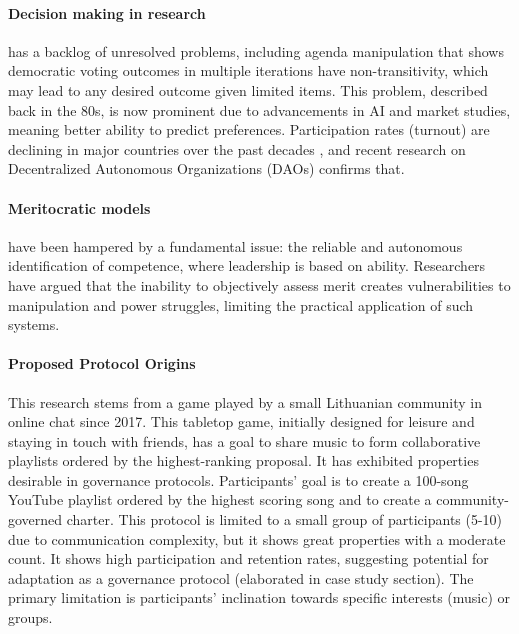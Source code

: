 \documentclass{article}
\begin{document}
\begin{CJK}{UTF8}{gbsn}
\begin{multicols}{2}
        \paragraph{Decision making in research} has a backlog of unresolved problems, including agenda manipulation that shows democratic voting outcomes in multiple iterations have non-transitivity, which may lead to any desired outcome given limited items\cite{McKelvey1976}. This problem, described back in the 80s, is now prominent due to advancements in AI and market studies, meaning better ability to predict preferences. Participation rates (turnout) are declining in major countries over the past decades \cite{Lawrence23}\cite{Filip24}, and recent research on Decentralized Autonomous Organizations (DAOs) confirms that\cite{Rainer2023}\cite{Marcella2016}\cite{Xuan2024}.
        \paragraph{Meritocratic models} have been hampered by a fundamental issue: the reliable and autonomous identification of competence, where leadership is based on ability. Researchers have argued\cite{Arrow2000} that the inability to objectively assess merit creates vulnerabilities to manipulation and power struggles, limiting the practical application of such systems.
        \paragraph{Proposed Protocol Origins}\label{sec:protocol_origins}
        This research stems from a game played by a small Lithuanian community in online chat since 2017. This tabletop game, initially designed for leisure and staying in touch with friends, has a goal to share music to form collaborative playlists ordered by the highest-ranking proposal. It has exhibited properties desirable in governance protocols.
        Participants’ goal is to create a 100-song YouTube playlist ordered by the highest scoring song and to create a community-governed charter\cite{DariusYoutube}.
        This protocol is limited to a small group of participants (5-10) due to communication complexity, but it shows great properties with a moderate count.
        It shows high participation and retention rates, suggesting potential for adaptation as a governance protocol (elaborated in case study section). The primary limitation is participants' inclination towards specific interests (music) or groups.

\end{multicols}
\end{CJK}
\end{document}
